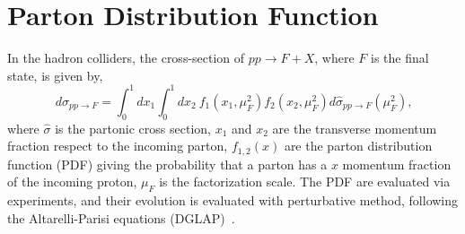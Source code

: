 \documentclass[PhD,binding=0.6cm]{../sapthesis}
\begin{document}
\chapter{Parton Distribution Function}
\label{pdfa}
In  the hadron colliders, the cross-section of $pp \to F+X $, where $F$ is the final state, is given by,
\begin{equation}
d \sigma_{pp \rightarrow F} = \int_0 ^1 dx_1 \int_0 ^1 d x_2 \: f_1(x_1, \mu_F^2) f_2(x_2, \mu_F^2) d \hat{\sigma}_{pp \rightarrow F}(\mu_F ^2)  \mbox{,}\end{equation}
where  $\hat{\sigma}$ is the partonic cross section, $x_1$ and  $x_2$ are the transverse momentum fraction respect to the incoming parton,  $f_{1,2}(x)$ are the 
parton distribution function (PDF) giving the probability that a parton has a $x$ momentum fraction of the incoming proton,  $\mu_F$ is the factorization scale.
The PDF are evaluated via experiments, and their evolution is evaluated with perturbative method, following the Altarelli-Parisi equations (DGLAP)~\cite{Altarelli:1977zs}.
\end{document}
